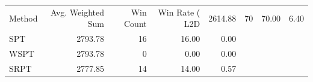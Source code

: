 \begin{tabular}{lrrrr}
\toprule
Method & Avg. Weighted Sum & Win Count & Win Rate (%
\midrule
L2D & 2614.88 & 70 & 70.00 & 6.40 \\
SPT & 2793.78 & 16 & 16.00 & 0.00 \\
WSPT & 2793.78 & 0 & 0.00 & 0.00 \\
SRPT & 2777.85 & 14 & 14.00 & 0.57 \\
\bottomrule
\end{tabular}
